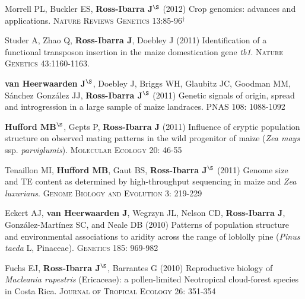 \documentclass[letterpaper]{article}
\begin{document}
\begin{etaremune}
\item Morrell PL, Buckler ES, {\bf Ross-Ibarra J}$^\S$ (2012) Crop genomics: advances and applications.  \textsc{Nature Reviews Genetics} 13:85-96$^\dagger$
\\%

\item Studer A, Zhao Q, {\bf Ross-Ibarra J}, Doebley J (2011) Identification of a functional transposon insertion in the maize domestication gene \emph{tb1}.  \textsc{Nature Genetics} 43:1160-1163.
\\%

\item {\bf van Heerwaarden J}$^\S$, Doebley J, Briggs WH, Glaubitz JC, Goodman MM, S\'{a}nchez Gonz\'{a}lez JJ, {\bf Ross-Ibarra J}$^\S$ (2011) Genetic signals of origin, spread and introgression in a large sample of maize landraces. PNAS 108: 1088-1092
\\%

\item {\bf Hufford MB}$^\S$, Gepts P, {\bf Ross-Ibarra J} (2011) Influence of cryptic population structure on observed mating patterns in the wild progenitor of maize (\emph{Zea mays} ssp. \emph{parviglumis}).  \textsc{Molecular Ecology} 20: 46-55
\\%

\item Tenaillon MI, {\bf Hufford MB}, Gaut BS, {\bf Ross-Ibarra J}$^\S$ (2011)  Genome size and TE content as determined by high-throughput sequencing in maize and \emph{Zea luxurians}.  \textsc{Genome Biology and Evolution } 3: 219-229
\\%

\item Eckert AJ, {\bf van Heerwaarden J}, Wegrzyn JL, Nelson CD, {\bf Ross-Ibarra J}, Gonz\'{a}lez-Mart\'{i}nez SC, and Neale DB (2010) Patterns of population structure and environmental associations to aridity across the range of loblolly pine (\emph{Pinus taeda} L, Pinaceae).  \textsc{Genetics} 185: 969-982
\\%

\item Fuchs EJ, {\bf Ross-Ibarra J}$^\S$, Barrantes G (2010) Reproductive biology of \emph{Macleania rupestris} (Ericaceae): a pollen-limited Neotropical cloud-forest species in Costa Rica.  \textsc{Journal of Tropical Ecology} 26: 351-354
\\%


\end{etaremune}
\end{document}
